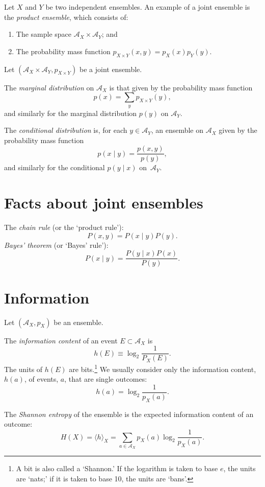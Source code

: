 \documentclass[10pt, a4paper, twocolumn]{article}
\begin{document}
Let $X$ and $Y$ be two independent ensembles. An example of a joint ensemble is
the \emph{product ensemble}, which consists of:
\begin{enumerate}
 \item The sample space $\mathcal{A}_X \times \mathcal{A}_Y$; and
 \item The probability mass function $p_{X\times Y}(x, y) = p_X(x)p_Y(y)$.
\end{enumerate}

Let $(\mathcal{A}_X\times \mathcal{A}_Y, p_{X\times Y})$ be a joint ensemble.

The \emph{marginal distribution} on $\mathcal{A}_X$ is that given by the
probability mass function
\[
p(x) = \sum_y p_{X\times Y}(y),
\]
and similarly for the marginal distribution $p(y)$ on $\mathcal{A}_Y$.

The \emph{conditional distribution} is, for each $y\in\mathcal{A}_Y$, an ensemble
on $\mathcal{A}_X$ given by the probability mass function
\[
p(x\mid y) = \frac{p(x, y)}{p(y)},
\]
and similarly for the conditional $p(y\mid x)$ on~$\mathcal{A}_Y$.

\section*{Facts about joint ensembles}
The \emph{chain rule} (or the `product rule'):
\[
P(x, y) = P(x\mid y)P(y).
\]
\emph{Bayes' theorem} (or `Bayes' rule'):
\[
P(x\mid y)=\frac{P(y\mid x)P(x)}{P(y)}.
\]

\section*{Information}
Let $(\mathcal{A}_X, p_X)$ be an ensemble.

The \emph{information content} of an event $E\subset\mathcal{A}_X$ is
\[
h(E) \equiv \log_2\frac{1}{P_X(E)}.
\]
The units of $h(E)$ are bits.\footnote{A bit is also called a `Shannon.' If the
logarithm is taken to base $e$, the units are `nats;' if it is taken to base 10,
the units are `bans'.}  We usually consider only the information content,
$h(a)$, of events, $a$, that are single outcomes:
\[
h(a) = \log_2\frac{1}{p_X(a)}.
\]

The \emph{Shannon entropy} of the ensemble is the expected information content
of an outcome:
\[
H(X) = \langle h \rangle_X = \sum_{a\in\mathcal{A}_X} p_X(a) \log_2 \frac{1}{p_X(a)}.
\]
\end{document}
